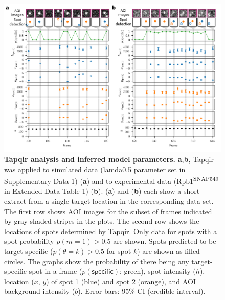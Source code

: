 \begin{figure}[h]
\centering
\includegraphics[width=\textwidth]{figures/figure3/figure3.png}
\caption{\textbf{Tapqir analysis and inferred model parameters.} \textbf{a},\textbf{b}, Tapqir was applied to simulated data (lamda0.5 parameter set in Supplementary Data 1) (\textbf{a}) and to experimental data (Rpb1\textsuperscript{SNAP549} in Extended Data Table 1) (\textbf{b}). (\textbf{a}) and (\textbf{b}) each show a short extract from a single target location in the corresponding data set. The first row shows AOI images for the subset of frames indicated by gray shaded stripes in the plots. The second row shows the locations of spots determined by Tapqir. Only data for spots with a spot probability $p(m=1) > 0.5$ are shown. Spots predicted to be target-specific ($p(\theta=k)>0.5$ for spot $k$) are shown as filled circles. The graphs show the probability of there being any target-specific spot in a frame ($p(\mathsf{specific})$; green), spot intensity ($h$), location ($x$, $y$) of spot 1 (blue) and spot 2 (orange), and AOI background intensity ($b$). Error bars: 95\% CI (credible interval).  }
\label{fig:tapqir_analysis}
\end{figure}

